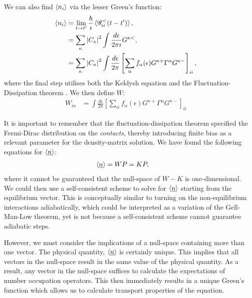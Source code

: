 \documentclass{article}
\begin{document}
\begin{multicols}{2}
        We can also find $\braket{n_i}$ via the lesser Green's function:
        \begin{align*}
            \braket{n_i} &= \lim_{t\rightarrow t'} \frac{\hbar}{\imath} \braket{\mathscr{G}^<_{ii}(t-t')}, \\
            &= \sum_\kappa \left|C_\kappa\right|^2 \int \frac{d\epsilon}{2 \pi \imath} G^{\kappa<}, \\
            &= \sum_\kappa \left|C_\kappa\right|^2 \int \frac{d\epsilon}{2 \pi} \left[ \sum_\alpha f_\alpha(\epsilon) G^{\kappa+} \Gamma^\alpha G^{\kappa-}\right]_{ii},
        \end{align*}
        where the final step utilises both the Keldysh equation \cite{diventra} and the Fluctuation-Dissipation theorem \cite{haugjauho}. We then define $W$:
        \begin{align}
        \label{eq:wmatrix}
        W_{i\kappa} &= \int \frac{d\epsilon}{2 \pi} \left[ \sum_\alpha f_\alpha(\epsilon) G^{\kappa+} \Gamma^\alpha G^{\kappa-}\right]_{ii}
        \end{align}
         
        It is important to remember that the fluctuation-dissipation theorem specified the Fermi-Dirac distribution on the \emph{contacts}, thereby introducing finite bias as a relevant parameter for the density-matrix solution. We have found the following equations for $\braket{\underline{n}}$:
        \begin{align}
            \braket{\underline{n}} &= WP = KP\label{eq:selfconsistent},
        \end{align}
        where it cannot be guaranteed that the null-space of $W-K$ is one-dimensional. We could then use a self-consistent scheme to solve for $\braket{\underline{n}}$ starting from the equilibrium vector. This is conceptually similar to turning on the non-equilibrium interactions adiabatically, which could be interpreted as a variation of the Gell-Man-Low theorem\cite{gellmannlow, molinari}, yet is not because a self-consistent scheme cannot guarantee adiabatic steps.
        
        However, we must consider the implications of a null-space containing more than one vector. The physical quantity, $\braket{\underline{n}}$ is certainly unique. This implies that all vectors in the null-space result in the same value of the physical quantity. As a result, any vector in the null-space suffices to calculate the expectations of number occupation operators. This then immediately results in a unique Green's function which allows us to calculate transport properties of the equation.



\end{multicols}
\end{document}
